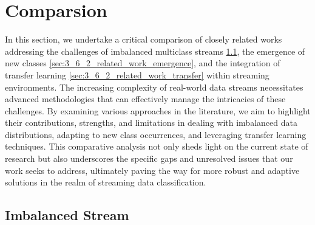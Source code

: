 \section{Comparsion} 
\label{sec:3_6_comparsion}

In this section, we undertake a critical comparison of closely related works addressing the challenges of imbalanced multiclass streams \ref{sec:3_6_1_related_work_imbalanced}, the emergence of new classes \ref{sec:3_6_2_related_work_emergence}, and the integration of transfer learning \ref{sec:3_6_2_related_work_transfer} within streaming environments. The increasing complexity of real-world data streams necessitates advanced methodologies that can effectively manage the intricacies of these challenges. By examining various approaches in the literature, we aim to highlight their contributions, strengths, and limitations in dealing with imbalanced data distributions, adapting to new class occurrences, and leveraging transfer learning techniques. This comparative analysis not only sheds light on the current state of research but also underscores the specific gaps and unresolved issues that our work seeks to address, ultimately paving the way for more robust and adaptive solutions in the realm of streaming data classification.


\subsection{Imbalanced Stream}
\label{sec:3_6_1_related_work_imbalanced}

